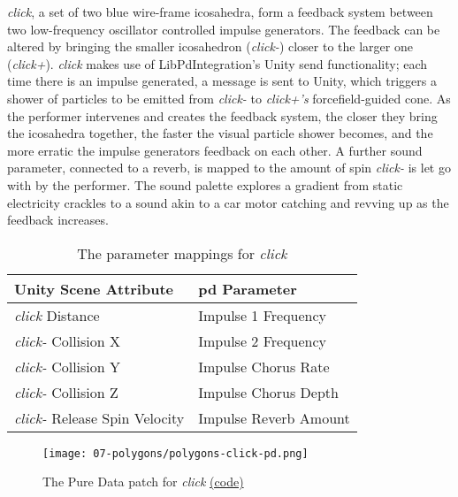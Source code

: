 \textit{click}, a set of two blue wire-frame icosahedra, form a feedback system between two low-frequency oscillator controlled impulse generators. The feedback can be altered by bringing the smaller icosahedron (\textit{click-}) closer to the larger one (\textit{click+}). \textit{click} makes use of LibPdIntegration's Unity send functionality; each time there is an impulse generated, a message is sent to Unity, which triggers a shower of particles to be emitted from \textit{click-} to \textit{click+'s} forcefield-guided cone. As the performer intervenes and creates the feedback system, the closer they bring the icosahedra together, the faster the visual particle shower becomes, and the more erratic the impulse generators feedback on each other. A further sound parameter, connected to a reverb, is mapped to the amount of spin \textit{click-} is let go with by the performer. The sound palette explores a gradient from static electricity crackles to a sound akin to a car motor catching and revving up as the feedback increases.
\begin{table}
    \centering
    \begin{tabular}{ l|l }
        \textbf{Unity Scene Attribute}         & \textbf{\gls{pd} Parameter}   \\
        \hline      
        \textit{click} Distance              & Impulse 1 Frequency           \\
        \textit{click-} Collision X            & Impulse 2 Frequency           \\
        \textit{click-} Collision Y            & Impulse Chorus Rate           \\
        \textit{click-} Collision Z            & Impulse Chorus Depth          \\
        \textit{click-} Release Spin Velocity  & Impulse Reverb Amount     
    \end{tabular}
    \caption{The parameter mappings for \textit{click}}
    \label{fig: polygons-click-mapping}
\end{table}
\begin{figure}
    \centering
    \texttt{[image: 07-polygons/polygons-click-pd.png]}
    \caption{The Pure Data patch for \textit{click} \href{https://github.com/sambilbow/polygons/tree/main/unity/Assets/StreamingAssets/PdAssets/click\%2B-}{(code)}}
    \label{fig: polygons-click-pd}
\end{figure}

